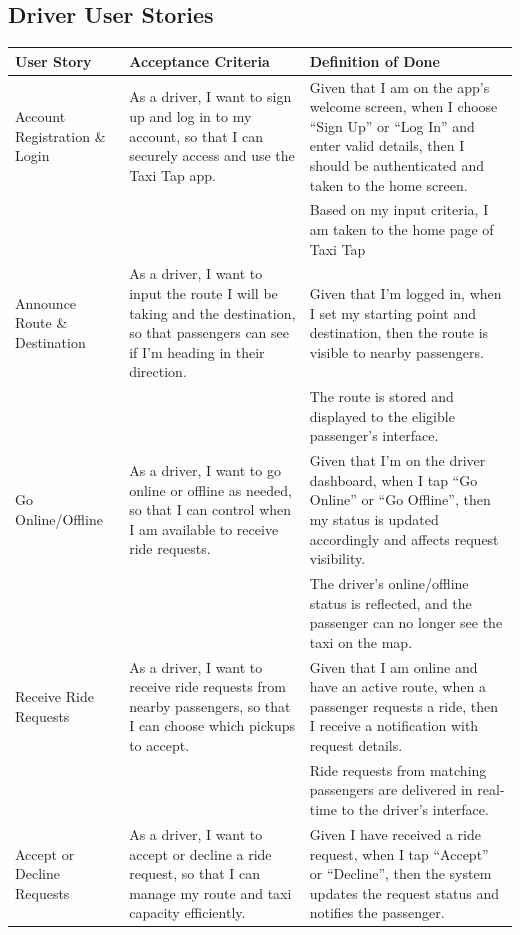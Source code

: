 \documentclass[a4paper,12pt]{article}
\begin{document}
\subsection{Driver User Stories}

\begin{longtable}{|p{4cm}|p{6cm}|p{5cm}|}
\hline
\textbf{User Story} & \textbf{Acceptance Criteria} & \textbf{Definition of Done} \\
\hline
Account Registration \& Login & As a driver, I want to sign up and log in to my account, so that I can securely access and use the Taxi Tap app. & Given that I am on the app’s welcome screen, when I choose “Sign Up” or “Log In” and enter valid details, then I should be authenticated and taken to the home screen. \\
& & Based on my input criteria, I am taken to the home page of Taxi Tap \\
\hline
Announce Route \& Destination & As a driver, I want to input the route I will be taking and the destination, so that passengers can see if I’m heading in their direction. & Given that I’m logged in, when I set my starting point and destination, then the route is visible to nearby passengers. \\
& & The route is stored and displayed to the eligible passenger's interface. \\
\hline
Go Online/Offline & As a driver, I want to go online or offline as needed, so that I can control when I am available to receive ride requests. & Given that I’m on the driver dashboard, when I tap “Go Online” or “Go Offline”, then my status is updated accordingly and affects request visibility. \\
& & The driver's online/offline status is reflected, and the passenger can no longer see the taxi on the map. \\
\hline
Receive Ride Requests & As a driver, I want to receive ride requests from nearby passengers, so that I can choose which pickups to accept. & Given that I am online and have an active route, when a passenger requests a ride, then I receive a notification with request details. \\
& & Ride requests from matching passengers are delivered in real-time to the driver’s interface. \\
\hline
Accept or Decline Requests & As a driver, I want to accept or decline a ride request, so that I can manage my route and taxi capacity efficiently. & Given I have received a ride request, when I tap “Accept” or “Decline”, then the system updates the request status and notifies the passenger. \\

\end{longtable}
\end{document}
